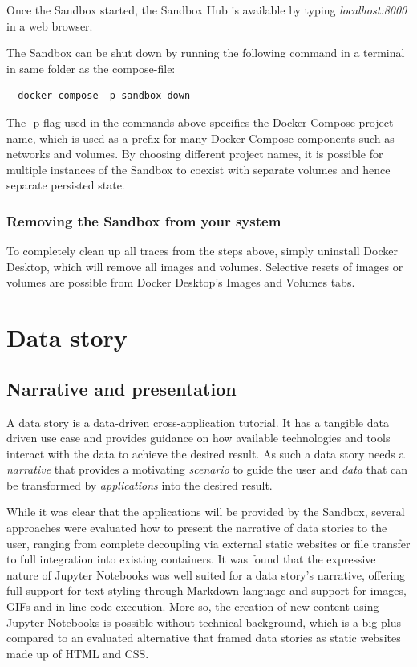 \documentclass[11pt, a4paper, oneside, parskip=full-]{scrartcl}
\begin{document}
Once the Sandbox started, the Sandbox Hub is available by typing
\emph{localhost:8000} in a web browser.

The Sandbox can be shut down by running the following command in a terminal in
same folder as the compose-file:
\begin{lstlisting}
  docker compose -p sandbox down
\end{lstlisting}

The -p flag used in the commands above specifies the Docker Compose project
name, which is used as a prefix for many Docker Compose components such as
networks and volumes. By choosing different project names, it is possible for
multiple instances of the Sandbox to coexist with separate volumes and hence
separate persisted state.

\subsubsection*{Removing the Sandbox from your system}
To completely clean up all traces from the steps above, simply uninstall Docker
Desktop, which will remove all images and volumes. Selective resets of images or
volumes are possible from Docker Desktop's Images and Volumes tabs.

\section{Data story}

\subsection{Narrative and presentation}
A data story is a data-driven cross-application tutorial. It has a tangible data
driven use case and provides guidance on how available technologies and tools
interact with the data to achieve the desired result. As such a data story needs
a \emph{narrative} that provides a motivating \emph{scenario} to guide the user
and \emph{data} that can be transformed by \emph{applications} into the desired
result.

While it was clear that the applications will be provided by the Sandbox,
several approaches were evaluated how to present the narrative of data stories
to the user, ranging from complete decoupling via external static websites or
file transfer to full integration into existing containers. It was found that
the expressive nature of Jupyter Notebooks was well suited for a data story's
narrative, offering full support for text styling through Markdown language and
support for images, GIFs and in-line code execution. More so, the creation of
new content using Jupyter Notebooks is possible without technical background,
which is a big plus compared to an evaluated alternative that framed data
stories as static websites made up of HTML and CSS.
\end{document}
